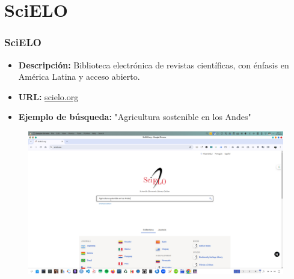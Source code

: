 \documentclass[
11pt, %
]{beamer}
\begin{document}
\section{SciELO}
\begin{frame}
	\frametitle{SciELO}
	\begin{itemize}
		\item \textbf{Descripción:} Biblioteca electrónica de revistas científicas, con énfasis en América Latina y acceso abierto.
		\item \textbf{URL:} \href{https://scielo.org}{scielo.org}
		\item \textbf{Ejemplo de búsqueda:} "Agricultura sostenible en los Andes"
	\end{itemize}
		\begin{figure}
		\centering
		\includegraphics[width=0.9\linewidth]{images/scielo.png}
		\label{fig:screenshot010}
	\end{figure}
\end{frame}

\end{document}
